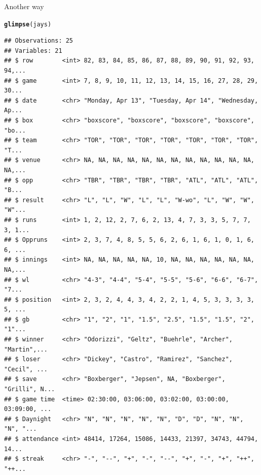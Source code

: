 \documentclass[unknownkeysallowed]{beamer}\usepackage[]{graphicx}\usepackage[]{color}
\makeatletter
\newcommand{\hlstd}[1]{\textcolor[rgb]{0.345,0.345,0.345}{#1}}%
\newcommand{\hlkwd}[1]{\textcolor[rgb]{0.737,0.353,0.396}{\textbf{#1}}}%
\newenvironment{kframe}{%
 \def\at@end@of@kframe{}%
 \ifinner\ifhmode%
  \def\at@end@of@kframe{\end{minipage}}%
  \begin{minipage}{\columnwidth}%
 \fi\fi%
 \def\FrameCommand##1{\hskip\@totalleftmargin \hskip-\fboxsep
 \colorbox{shadecolor}{##1}\hskip-\fboxsep
     \hskip-\linewidth \hskip-\@totalleftmargin \hskip\columnwidth}%
 \MakeFramed {\advance\hsize-\width
   \@totalleftmargin\z@ \linewidth\hsize
   \@setminipage}}%
 {\par\unskip\endMakeFramed%
 \at@end@of@kframe}
\newenvironment{knitrout}{}{} %
\makeatother
\begin{document}
\begin{frame}[fragile]{Another way}
\begin{knitrout}\scriptsize
{}\color{fgcolor}\begin{kframe}
\begin{alltt}
\hlkwd{glimpse}\hlstd{(jays)}
\end{alltt}
\begin{verbatim}
## Observations: 25
## Variables: 21
## $ row        <int> 82, 83, 84, 85, 86, 87, 88, 89, 90, 91, 92, 93, 94,...
## $ game       <int> 7, 8, 9, 10, 11, 12, 13, 14, 15, 16, 27, 28, 29, 30...
## $ date       <chr> "Monday, Apr 13", "Tuesday, Apr 14", "Wednesday, Ap...
## $ box        <chr> "boxscore", "boxscore", "boxscore", "boxscore", "bo...
## $ team       <chr> "TOR", "TOR", "TOR", "TOR", "TOR", "TOR", "TOR", "T...
## $ venue      <chr> NA, NA, NA, NA, NA, NA, NA, NA, NA, NA, NA, NA, NA,...
## $ opp        <chr> "TBR", "TBR", "TBR", "TBR", "ATL", "ATL", "ATL", "B...
## $ result     <chr> "L", "L", "W", "L", "L", "W-wo", "L", "W", "W", "W"...
## $ runs       <int> 1, 2, 12, 2, 7, 6, 2, 13, 4, 7, 3, 3, 5, 7, 7, 3, 1...
## $ Oppruns    <int> 2, 3, 7, 4, 8, 5, 5, 6, 2, 6, 1, 6, 1, 0, 1, 6, 6, ...
## $ innings    <int> NA, NA, NA, NA, NA, 10, NA, NA, NA, NA, NA, NA, NA,...
## $ wl         <chr> "4-3", "4-4", "5-4", "5-5", "5-6", "6-6", "6-7", "7...
## $ position   <int> 2, 3, 2, 4, 4, 3, 4, 2, 2, 1, 4, 5, 3, 3, 3, 3, 5, ...
## $ gb         <chr> "1", "2", "1", "1.5", "2.5", "1.5", "1.5", "2", "1"...
## $ winner     <chr> "Odorizzi", "Geltz", "Buehrle", "Archer", "Martin",...
## $ loser      <chr> "Dickey", "Castro", "Ramirez", "Sanchez", "Cecil", ...
## $ save       <chr> "Boxberger", "Jepsen", NA, "Boxberger", "Grilli", N...
## $ game time  <time> 02:30:00, 03:06:00, 03:02:00, 03:00:00, 03:09:00, ...
## $ Daynight   <chr> "N", "N", "N", "N", "N", "D", "D", "N", "N", "N", "...
## $ attendance <int> 48414, 17264, 15086, 14433, 21397, 34743, 44794, 14...
## $ streak     <chr> "-", "--", "+", "-", "--", "+", "-", "+", "++", "++...
\end{verbatim}
\end{kframe}
\end{knitrout}
\end{frame}
\end{document}
